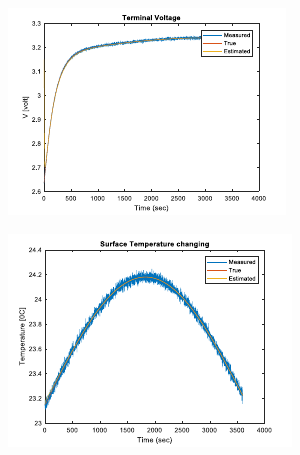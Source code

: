 \documentclass[12pt]{article}
\begin{document}
\begin{figure}[H]
	\centering
	\begin{subfigure}[t]{0.3\linewidth}
		\includegraphics[width=\linewidth]{figures/estVTini1.pdf}
	\end{subfigure}
	\begin{subfigure}[t]{0.3\linewidth}
		\includegraphics[width=\linewidth]{figures/estVTini2.pdf}
	\end{subfigure}	
	\begin{subfigure}[t]{0.3\linewidth}

\end{subfigure}
\end{figure}
\end{document}
